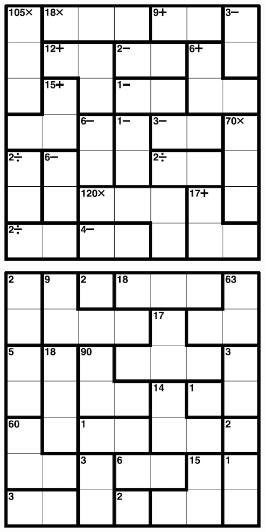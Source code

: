 
\includegraphics[scale=1]{Gambar/Lampiran/7x7_13.png}

\includegraphics[scale=1]{Gambar/Lampiran/7x7_14.png}
